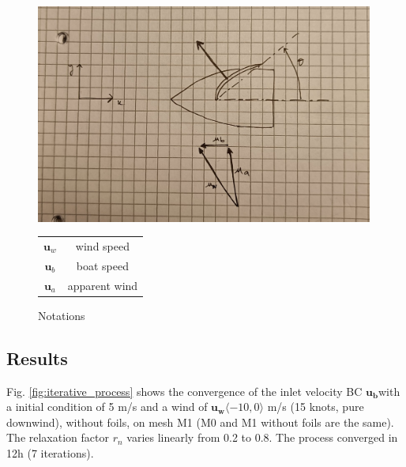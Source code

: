     \begin{figure}[ht!]
        \centering
        \begin{minipage}{0.65\textwidth}
            \includegraphics[width=0.99\textwidth]{figures/axes.jpeg}%
        \end{minipage}
        \begin{minipage}{0.34\textwidth}
            \vfill
            \begin{tabular}{c|c}
                $\mathbf{u}_w$ & wind speed \\
                $\mathbf{u}_b$ & boat speed \\
                $\mathbf{u}_a$ & apparent wind
            \end{tabular}
            \vfill
        \end{minipage}
        
        \caption{Notations}
        \label{fig:speedtriangle}
    \end{figure}

\clearpage
\subsection{Results}
    Fig. \ref{fig:iterative_process} shows the convergence of the inlet velocity BC $\mathbf{u_b} $with a initial condition of 5 m/s and a wind of $\mathbf{u_w}\langle -10, 0\rangle$ m/s (15 knots, pure downwind), without foils, on mesh M1 (M0 and M1 without foils are the same). The relaxation factor $r_n$ varies linearly from 0.2 to 0.8. The process converged in 12h (7 iterations). 

